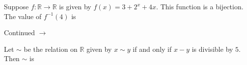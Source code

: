 \documentclass[addpoints]{exam}
\def\pageturn{\vfill
\begin{flushright}
	\begin{small}
		Continued $\rightarrow$
	\end{small}
\end{flushright}
\newpage}
\begin{document}
\begin{questions}


\question[2] Suppose $f: \mathbb{R} \rightarrow \mathbb{R}$ is given by $f(x) = 3 + 2^x + 4x$. This function is a bijection. The value of $f^{-1}(4)$ is 

 	\pageturn



\question[2] Let $\sim$ be the relation on $\mathbb{R}$ given by $x \sim y$ if and only if $x-y$ is divisible by $5$. Then $\sim$ is 
\end{questions}
\end{document}
